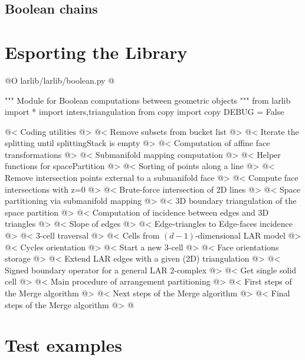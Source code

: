 \documentclass[11pt,oneside]{article}    %
\begin{document}
\subsection{Boolean chains}

\section{Esporting the Library}

@O larlib/larlib/boolean.py
@{""" Module for Boolean computations between geometric objects """
from larlib import *
import inters,triangulation
from copy import copy
DEBUG = False

@< Coding utilities @>
@< Remove subsets from bucket list @>
@< Iterate the splitting until splittingStack is empty @>
@< Computation of affine face transformations @>
@< Submanifold mapping computation @>
@< Helper functions for spacePartition @>
@< Sorting of points along a line @>
@< Remove intersection points external to a submanifold face @>
@< Compute face intersections with z=0 @>
@< Brute-force intersection of 2D lines @>
@< Space partitioning via submanifold mapping @>
@< 3D boundary triangulation of the space partition @>
@< Computation of incidence between edges and 3D triangles @>
@< Slope of edges @>
@< Edge-triangles to Edge-faces incidence @>
@< 3-cell traversal @>
@< Cells from $(d-1)$-dimensional LAR model @>
@< Cycles orientation @>
@< Start a new 3-cell @>
@< Face orientations storage @>
@< Extend LAR edges with a given (2D) triangulation @>
@< Signed boundary operator for a general LAR 2-complex @>
@< Get single solid cell @>
@< Main procedure of arrangement partitioning @>
@< First steps of the Merge algorithm @>
@< Next steps of the Merge algorithm @>
@< Final steps of the Merge algorithm @>
@}
    
\section{Test examples}
\end{document}
